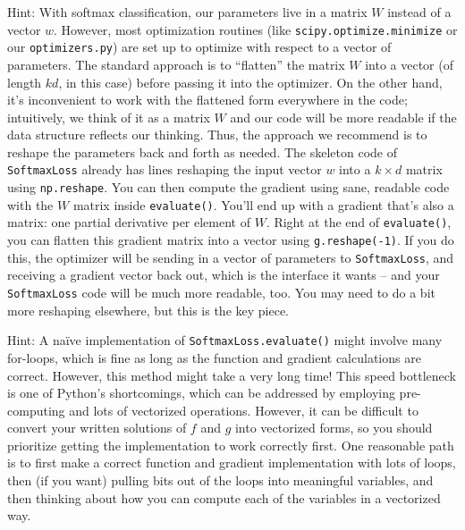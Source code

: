 \documentclass{article}
\begin{document}
Hint: With softmax classification, our parameters live in a matrix $W$ instead of a vector $w$. However, most optimization routines (like \verb|scipy.optimize.minimize| or our \verb|optimizers.py|) are set up to optimize with respect to a vector of parameters. The standard approach is to ``flatten'' the matrix $W$ into a vector (of length $kd$, in this case) before passing it into the optimizer. On the other hand, it's inconvenient to work with the flattened form everywhere in the code; intuitively, we think of it as a matrix $W$ and our code will be more readable if the data structure reflects our thinking. Thus, the approach we recommend is to reshape the parameters back and forth as needed. The skeleton code of \verb|SoftmaxLoss| already has lines reshaping the input vector $w$ into a $k \times d$ matrix using \verb|np.reshape|. You can then compute the gradient using sane, readable code with the $W$ matrix inside \verb|evaluate()|. You'll end up with a gradient that's also a matrix: one partial derivative per element of $W$. Right at the end of \verb|evaluate()|, you can flatten this gradient matrix into a vector using \verb|g.reshape(-1)|. If you do this, the optimizer will be sending in a vector of parameters to \verb|SoftmaxLoss|, and receiving a gradient vector back out, which is the interface it wants -- and your \verb|SoftmaxLoss| code will be much more readable, too. You may need to do a bit more reshaping elsewhere, but this is the key piece.

Hint: A na\"ive implementation of \verb|SoftmaxLoss.evaluate()| might involve many for-loops, which is fine as long as the function and gradient calculations are correct. However, this method might take a very long time! This speed bottleneck is one of Python's shortcomings, which can be addressed by employing pre-computing and lots of vectorized operations. However, it can be difficult to convert your written solutions of $f$ and $g$ into vectorized forms, so you should prioritize getting the implementation to work correctly first. One reasonable path is to first make a correct function and gradient implementation with lots of loops, then (if you want) pulling bits out of the loops into meaningful variables, and then thinking about how you can compute each of the variables in a vectorized way.

\end{document}
